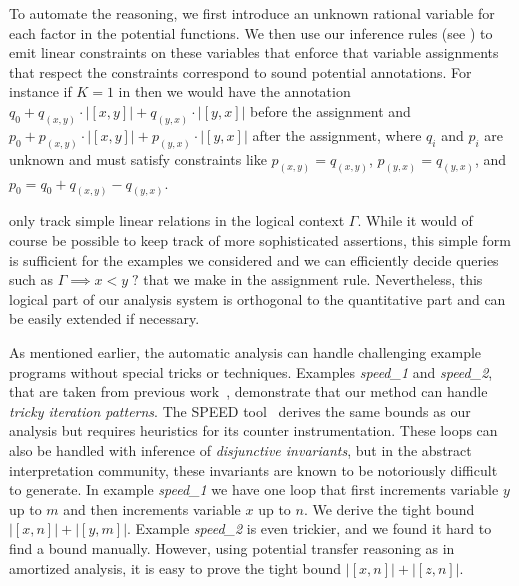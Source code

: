 \documentclass[nocopyrightspace,preprint]{sigplanconf}
\newcommand{\iffull}[2]{\ifx\fullversion\undefined{#2}\else{#1}\fi}
\newcommand{\pref}[1]{\prettyref{#1}}
\begin{document}
To automate the reasoning, we first introduce an unknown rational
variable for each factor in the potential functions.  We then use our
inference rules (see \pref{sec:AAA}) to emit linear constraints on
these variables that enforce that variable assignments that respect
the constraints correspond to sound potential annotations.  For
instance if $K = 1$ in \pref{fig:ex1} then we would have the
annotation $q_0 + q_{(x,y)} {\cdot} |[x,y]| + q_{(y,x)} {\cdot}
|[y,x]|$ before the assignment and $p_0 + p_{(x,y)} {\cdot} |[x,y]| +
p_{(y,x)} {\cdot} |[y,x]|$ after the assignment, where $q_i$ and $p_i$
are unknown and must satisfy constraints like $p_{(x,y)} = q_{(x,y)}$,
$p_{(y,x)} = q_{(y,x)}$, and $p_0 = q_0 + q_{(x,y)} - q_{(y,x)}$.

\iffull{It might be surprising that we}{We} only track simple linear relations in
the logical context $\Gamma$.  While it would of course be possible to keep
track of more sophisticated assertions, this simple form is
sufficient for the examples we considered and we can efficiently
decide queries such as $\Gamma \implies x<y \; ?$ that we make in the
assignment rule.  Nevertheless, this logical part of our analysis
system is orthogonal to the quantitative part and can be easily
extended if necessary.

As mentioned earlier, the automatic analysis can handle challenging example
programs without special tricks or techniques.  Examples
\emph{speed\_1} and \emph{speed\_2}, that are taken from previous
work~\cite{GulwaniMC09},  demonstrate that our method can handle
\emph{tricky iteration patterns}.  The SPEED tool~\cite{GulwaniMC09}
derives the same bounds as our analysis but requires heuristics for
its counter instrumentation.  These loops can also be handled with inference of
\emph{disjunctive invariants}, but in the abstract interpretation
community, these invariants are known to be notoriously difficult to
generate.
%
In example \emph{speed\_1} we have one loop that first increments
variable $y$ up to $m$ and then increments variable $x$ up to $n$.  We
derive the tight bound $|[x, n]| + |[y, m]|$.
%
Example \emph{speed\_2} is even trickier, and we found it hard to
find a bound manually.  However, using potential transfer reasoning as
in amortized analysis, it is easy to prove the tight bound
$|[x, n]| + |[z, n]|$.
\end{document}
